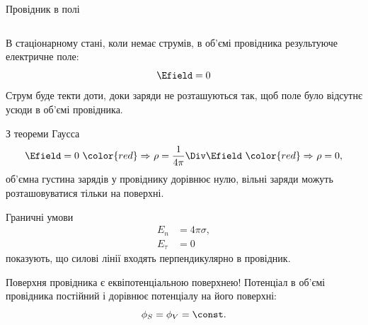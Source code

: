 \documentclass[onlytextwidth]{beamer}
\begin{document}
\begin{frame}{Провідник в полі}{}
\begin{columns}
\begin{column}{0.4\linewidth}
\begin{overprint}
\begin{center}
				\end{center}
			\end{overprint}
		\end{column}
	\end{columns}
	\begin{overprint}
		\begin{block}{}\justifying
			\alert{В стаціонарному стані}, коли немає струмів, в \alert{об'ємі
				провідника результуюче електричне поле}:
			\begin{equation*}
				\Efield = 0
			\end{equation*}
			Струм буде текти доти, доки заряди не розташуються так, щоб поле було
			відсутнє усюди в об'ємі провідника.
		\end{block}
		\begin{block}{}\justifying
			З теореми Гаусса
			\begin{equation*}
				\Efield = 0\ {\color{red}\Rightarrow}\ \rho = \frac1{4\pi} \Div\Efield\
				{\color{red}\Rightarrow}\ \rho = 0,
			\end{equation*}
			об'ємна густина зарядів у провіднику дорівнює нулю, \alert{вільні заряди можуть
				розташовуватися тільки на поверхні}.
		\end{block}
		\begin{block}{}
			Граничні умови
			\begin{align*}
				E_n      & = 4\pi\sigma, \\
				E_{\tau} & = 0
			\end{align*}
			показують, що \alert{силові лінії входять перпендикулярно в провідник}.
		\end{block}
        \begin{alertblock}{}
            Поверхня провідника є еквіпотенціальною поверхнею! Потенціал в об'ємі провідника
            постійний і дорівнює потенціалу на його поверхні:
            \begin{equation*}
                \phi_S = \phi_V = \const.
            \end{equation*}
        \end{alertblock}
	\end{overprint}
\end{frame}
\end{document}

